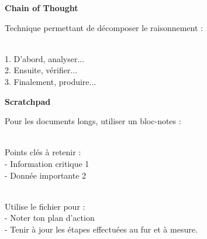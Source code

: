 \begin{Methode}
    \begin{MultiColonnes}{2}
        \tcbitem \textbf{Chain of Thought} 

        Technique permettant de décomposer le raisonnement :
        
        \begin{tcolorbox}[colback=gray!5, colframe=gray!50]
            \ttfamily\small
            \\
            \hspace{1em}1. D'abord, analyser...\\
            \hspace{1em}2. Ensuite, vérifier...\\
            \hspace{1em}3. Finalement, produire...\\
        \end{tcolorbox}
        \tcbitem \textbf{Scratchpad} 

        Pour les documents longs, utiliser un bloc-notes :

        \vfill
        \begin{tcolorbox}[colback=gray!5, colframe=gray!50]
            \ttfamily\small
            \\
            \hspace{1em}Points clés à retenir :\\
            \hspace{1em}- Information critique 1\\
            \hspace{1em}- Donnée importante 2\\
        \end{tcolorbox}
    \end{MultiColonnes}
    \begin{tcolorbox}[title=Scratchpad permanent :,colback=gray!5, colframe=gray!50]
        \ttfamily\small
        \\
        \hspace{1em}Utilise le fichier  pour :\\
        \hspace{1em}- Noter ton plan d'action\\
        \hspace{1em}- Tenir à jour les étapes effectuées au fur et à mesure.\\
    \end{tcolorbox}
\end{Methode}

